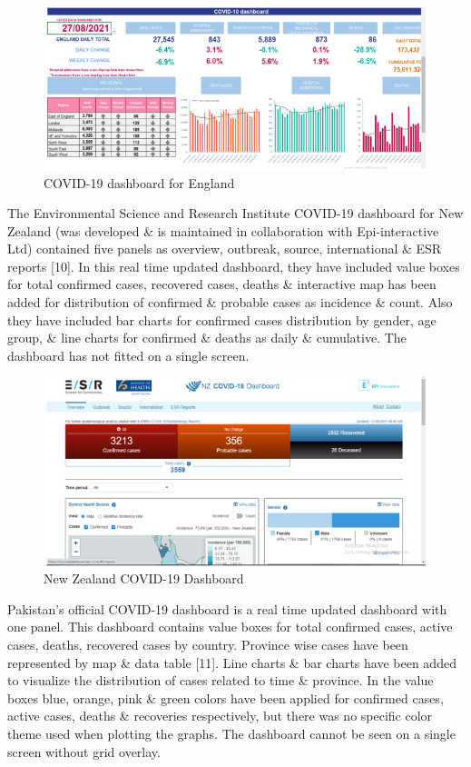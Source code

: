 \documentclass[
]{article}
\begin{document}
\begin{figure}
\includegraphics[width=8.46in]{Images/5} \caption{COVID-19 dashboard for England}\label{fig:unnamed-chunk-12}
\end{figure}

The Environmental Science and Research Institute COVID-19 dashboard for
New Zealand (was developed \& is maintained in collaboration with
Epi-interactive Ltd) contained five panels as overview, outbreak,
source, international \& ESR reports {[}10{]}. In this real time updated
dashboard, they have included value boxes for total confirmed cases,
recovered cases, deaths \& interactive map has been added for
distribution of confirmed \& probable cases as incidence \& count. Also
they have included bar charts for confirmed cases distribution by
gender, age group, \& line charts for confirmed \& deaths as daily \&
cumulative. The dashboard has not fitted on a single screen.

\begin{figure}
\includegraphics[width=8.47in]{Images/6} \caption{New Zealand COVID-19 Dashboard}\label{fig:unnamed-chunk-13}
\end{figure}

Pakistan's official COVID-19 dashboard is a real time updated dashboard
with one panel. This dashboard contains value boxes for total confirmed
cases, active cases, deaths, recovered cases by country. Province wise
cases have been represented by map \& data table {[}11{]}. Line charts
\& bar charts have been added to visualize the distribution of cases
related to time \& province. In the value boxes blue, orange, pink \&
green colors have been applied for confirmed cases, active cases, deaths
\& recoveries respectively, but there was no specific color theme used
when plotting the graphs. The dashboard cannot be seen on a single
screen without grid overlay.
\end{document}
